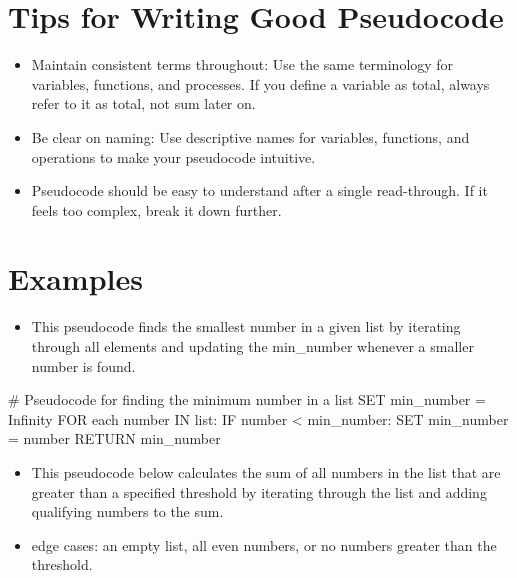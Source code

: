 \documentclass[
  letterpaper,
  DIV=11,
  numbers=noendperiod]{scrreprt}
\newenvironment{Shaded}{\begin{snugshade}}{\end{snugshade}}
\newcommand{\NormalTok}[1]{\textcolor[rgb]{0.00,0.23,0.31}{#1}}
\providecommand{\tightlist}{%
  \setlength{\itemsep}{0pt}\setlength{\parskip}{0pt}}\usepackage{longtable,booktabs,array}
\begin{document}
\section{Tips for Writing Good
Pseudocode}\label{tips-for-writing-good-pseudocode}

\begin{itemize}
\tightlist
\item
  Maintain consistent terms throughout: Use the same terminology for
  variables, functions, and processes. If you define a variable as
  total, always refer to it as total, not sum later on.
\item
  Be clear on naming: Use descriptive names for variables, functions,
  and operations to make your pseudocode intuitive.
\item
  Pseudocode should be easy to understand after a single read-through.
  If it feels too complex, break it down further.
\end{itemize}

\section{Examples}\label{examples}

\begin{itemize}
\tightlist
\item
  This pseudocode finds the smallest number in a given list by iterating
  through all elements and updating the min\_number whenever a smaller
  number is found.
\end{itemize}

\begin{Shaded}
\begin{Highlighting}[]
\NormalTok{\# Pseudocode for finding the minimum number in a list}
\NormalTok{SET min\_number = Infinity}
\NormalTok{FOR each number IN list:}
\NormalTok{    IF number \textless{} min\_number:}
\NormalTok{        SET min\_number = number}
\NormalTok{RETURN min\_number}
\end{Highlighting}
\end{Shaded}

\begin{itemize}
\tightlist
\item
  This pseudocode below calculates the sum of all numbers in the list
  that are greater than a specified threshold by iterating through the
  list and adding qualifying numbers to the sum.
\item
  edge cases: an empty list, all even numbers, or no numbers greater
  than the threshold.
\end{itemize}
\end{document}
